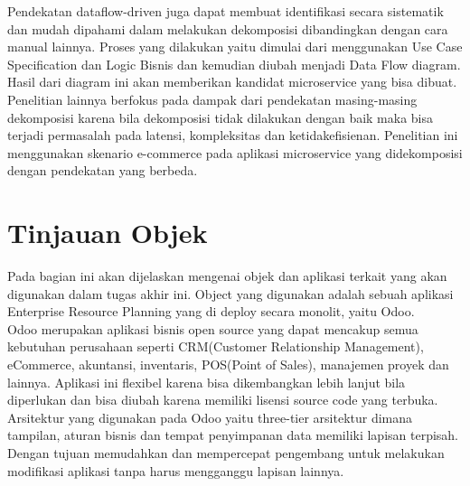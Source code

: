 Pendekatan dataflow-driven juga dapat membuat identifikasi secara sistematik dan mudah dipahami dalam melakukan dekomposisi dibandingkan dengan cara manual lainnya. Proses yang dilakukan yaitu dimulai dari menggunakan Use Case Specification dan Logic Bisnis dan kemudian diubah menjadi Data Flow diagram. Hasil dari diagram ini akan memberikan kandidat microservice yang bisa dibuat.\\

Penelitian lainnya berfokus pada dampak dari pendekatan masing-masing dekomposisi karena bila dekomposisi tidak dilakukan dengan baik maka bisa terjadi permasalah pada latensi, kompleksitas dan ketidakefisienan. Penelitian ini menggunakan skenario e-commerce pada aplikasi microservice yang didekomposisi dengan pendekatan yang berbeda.\\

\section{Tinjauan Objek}
Pada bagian ini akan dijelaskan mengenai objek dan aplikasi terkait yang akan digunakan dalam tugas akhir ini. Object yang digunakan adalah sebuah aplikasi Enterprise Resource Planning yang di deploy secara monolit, yaitu Odoo.\\

Odoo merupakan aplikasi bisnis open source yang dapat mencakup semua kebutuhan perusahaan seperti CRM(Customer Relationship Management), eCommerce, akuntansi, inventaris, POS(Point of Sales), manajemen proyek dan lainnya. Aplikasi ini flexibel karena bisa dikembangkan lebih lanjut bila diperlukan dan bisa diubah karena memiliki lisensi source code yang terbuka. \\

Arsitektur yang digunakan pada Odoo yaitu three-tier arsitektur dimana tampilan, aturan bisnis dan tempat penyimpanan data memiliki lapisan terpisah. Dengan tujuan memudahkan dan mempercepat pengembang untuk melakukan modifikasi aplikasi tanpa harus mengganggu lapisan lainnya.\\

